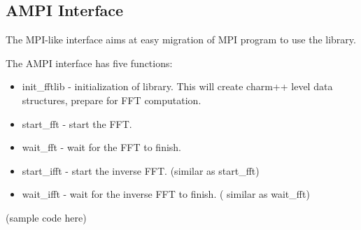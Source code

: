 \subsection {AMPI Interface}
The MPI-like interface aims at easy migration of MPI program to
use the library.

The AMPI interface has five functions:
\begin{itemize}
\item init\_fftlib - initialization of library. This will create
charm++ level data structures, prepare for FFT computation.
\item start\_fft - start the FFT. 
\item wait\_fft - wait for the FFT to finish. 
\item start\_ifft - start the inverse FFT. (similar as start\_fft)
\item wait\_ifft - wait for the inverse FFT to finish. ( similar as wait\_fft)
\end{itemize}

(sample code here)
\begin{alltt}
\end{alltt}


